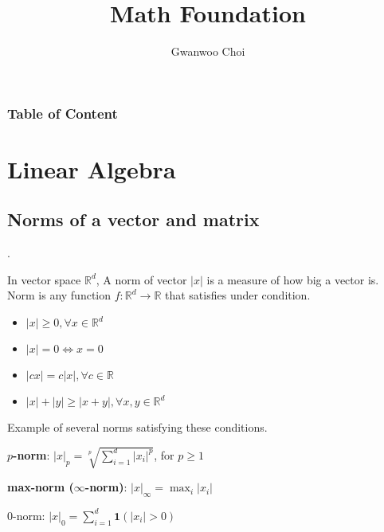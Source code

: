 \documentclass[8pt]{beamer}
\title{Math Foundation}
\author{Gwanwoo Choi}
\newcommand{\mbb}[1]{\mathbb{#1}}
\newcommand{\mb}[1]{\mathbf{#1}}
\newcommand{\tb}[1]{\textbf{#1}}
\newcommand{\abs}[1]{\left\lvert #1 \right\rvert}
\begin{document}
\begin{frame}
    \titlepage
\end{frame}

\begingroup
    \begin{frame}
        \frametitle{Table of Content}
        \tableofcontents
    \end{frame}
\endgroup

\section{Linear Algebra}
\subsection{Norms of a vector and matrix}

\begin{frame}{.}
    \begin{definition}
        In vector space $\mbb{R}^d$, A norm of vector $\abs{x}$ is a measure of how big a vector is. Norm is any function $f: \mbb{R}^d \rightarrow \mbb{R}$ that satisfies under condition.
        \begin{itemize}
            \item $\abs{x} \geq 0, \forall x\in \mbb{R}^d$
            \item $\abs{x} = 0 \iff x = 0$
            \item $\abs{cx} = c\abs{x}, \forall c \in \mbb{R}$
            \item $\abs{x} + \abs{y} \geq \abs{x+y}, \forall x,y \in \mbb{R}^d$
        \end{itemize}
    \end{definition}

    Example of several norms satisfying these conditions.

    \tb{$p$-norm}: $\abs{x}_p = \sqrt[p]{\sum_{i=1}^d \abs{x_i}^p}$, for $p \geq 1$

    \tb{max-norm ($\infty$-norm)}: $\abs{x}_\infty = \max_i \abs{x_i}$

    $0$-norm: $\abs{x}_0 = \sum_{i=1}^d \mb{1}(\abs{x_i} > 0 )$
\end{frame}
\end{document}
